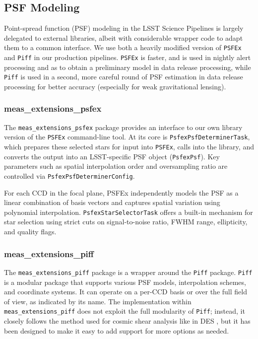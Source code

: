 \subsection{PSF Modeling}

\label{sec:psf_modeling}

Point-spread function (PSF) modeling in the LSST Science Pipelines is largely delegated to external libraries, albeit with considerable wrapper code to adapt them to a common interface.
We use both a heavily modified version of \texttt{PSFEx} \citep{2011ASPC..442..435B} and \texttt{Piff} \citep{2021ascl.soft02024J,2021MNRAS.501.1282J} in our production pipelines.
\texttt{PSFEx} is faster, and is used in nightly alert processing and as to obtain a preliminary model in data release processing, while \texttt{Piff} is used in a second, more careful round of PSF estimation in data release processing for better accuracy (especially for weak gravitational lensing).

\subsubsection{meas\_extensions\_psfex}\label{sec:meas_extensions_psfex}

The \texttt{meas\_extensions\_psfex} package provides an interface to our own library version of the \texttt{PSFEx} command-line tool.
At its core is \texttt{PsfexPsfDeterminerTask}, which prepares these selected stars for input into \texttt{PSFEx}, calls into the library, and converts the output into an LSST-specific PSF object (\texttt{PsfexPsf}).
Key parameters such as spatial interpolation order and oversampling ratio are controlled via \texttt{PsfexPsfDeterminerConfig}.

For each CCD in the focal plane, PSFEx independently models the PSF as a linear combination of basis vectors and captures spatial variation using polynomial interpolation.
\texttt{PsfexStarSelectorTask} offers a built-in mechanism for star selection using strict cuts on signal-to-noise ratio, FWHM range, ellipticity, and quality flags.

\subsubsection{meas\_extensions\_piff}
\label{sec:meas_extensions_piff}

The \texttt{meas\_extensions\_piff} package is a wrapper around the \texttt{Piff} package.
\texttt{Piff} is a modular package that supports various PSF models, interpolation schemes, and coordinate systems.
It can operate on a per-CCD basis or over the full field of view, as indicated by its name.
The implementation within  \texttt{meas\_extensions\_piff} does not exploit the full modularity of \texttt{Piff}; instead, it closely follows the method used for cosmic shear analysis like in DES \citep{2021MNRAS.501.1282J,2025OJAp....8E..26S}, but it has been designed to make it easy to add support for more options as needed.

